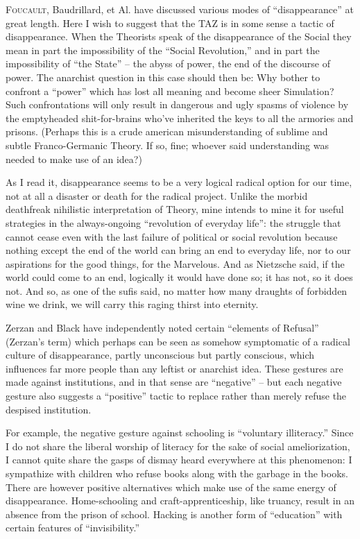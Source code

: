\documentclass[a4paper,english,10pt,twoside]{article}
\begin{document}
\lettrine{F}{oucault}, Baudrillard, et Al. have discussed various modes of \enquote{disappearance} at great length. Here I wish to suggest that the TAZ is in some sense a tactic of disappearance. When the Theorists speak of the disappearance of the Social they mean in part the impossibility of the \enquote{Social Revolution,} and in part the impossibility of \enquote{the State} -- the abyss of power, the end of the discourse of power. The anarchist question in this case should then be: Why bother to confront a \enquote{power} which has lost all meaning and become sheer Simulation? Such confrontations will only result in dangerous and ugly spasms of violence by the emptyheaded shit-for-brains who've inherited the keys to all the armories and prisons. (Perhaps this is a crude american misunderstanding of sublime and subtle Franco-Germanic Theory. If so, fine; whoever said understanding was needed to make use of an idea?)

\medskip
As I read it, disappearance seems to be a very logical radical option for our time, not at all a disaster or death for the radical project. Unlike the morbid deathfreak nihilistic interpretation of Theory, mine intends to mine it for useful strategies in the always-ongoing \enquote{revolution of everyday life}: the struggle that cannot cease even with the last failure of political or social revolution because nothing except the end of the world can bring an end to everyday life, nor to our aspirations for the good things, for the Marvelous. And as Nietzsche said, if the world could come to an end, logically it would have done so; it has not, so it does not. And so, as one of the sufis said, no matter how many draughts of forbidden wine we drink, we will carry this raging thirst into eternity.

\medskip
Zerzan and Black have independently noted certain \enquote{elements of Refusal} (Zerzan's term) which perhaps can be seen as somehow symptomatic of a radical culture of disappearance, partly unconscious but partly conscious, which influences far more people than any leftist or anarchist idea. These gestures are made against institutions, and in that sense are \enquote{negative} -- but each negative gesture also suggests a \enquote{positive} tactic to replace rather than merely refuse the despised institution.

\medskip
For example, the negative gesture against schooling is \enquote{voluntary illiteracy.} Since I do not share the liberal worship of literacy for the sake of social ameliorization, I cannot quite share the gasps of dismay heard everywhere at this phenomenon: I sympathize with children who refuse books along with the garbage in the books. There are however positive alternatives which make use of the same energy of disappearance. Home-schooling and craft-apprenticeship, like truancy, result in an absence from the prison of school. Hacking is another form of \enquote{education} with certain features of \enquote{invisibility.}
\end{document}
